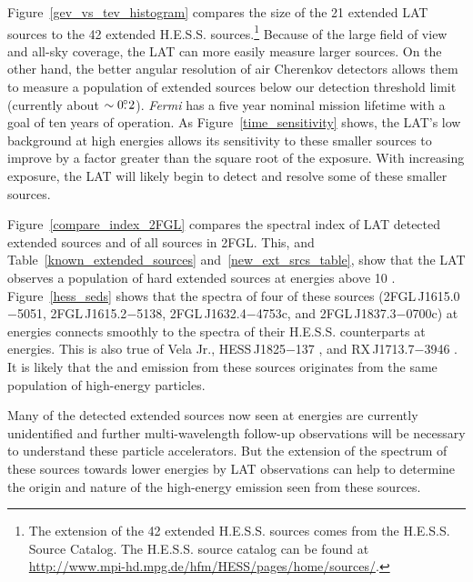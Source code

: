 \documentclass[12pt,preprint]{aastex}
\newcommand{\gev}{\text{GeV}\xspace}
\newcommand{\tev}{\text{TeV}\xspace}
\newcommand{\fermi}{\textit{Fermi}\xspace}
\begin{document}
Figure~\ref{gev_vs_tev_histogram} compares the size of the 21 extended
LAT sources to the 42 extended H.E.S.S. sources.\footnote{The 
\tev extension of
the 42 extended H.E.S.S. sources comes from the H.E.S.S. Source
Catalog. The H.E.S.S. source catalog can be found at \url{http://www.mpi-hd.mpg.de/hfm/HESS/pages/home/sources/}.}
Because of the large
field of view and all-sky coverage, the LAT can more easily measure
larger sources.  On the other hand, the 
better
angular resolution of air Cherenkov detectors allows them to measure a
population of extended sources below our detection threshold limit (currently 
about $\sim0\mbox{$.\!\!^\circ$}2$).  \fermi has a five year nominal mission lifetime with
a goal of ten years of operation.  As Figure~\ref{time_sensitivity} shows,
the LAT's low background at high energies allows its sensitivity 
to
these smaller sources to improve by a factor greater than the square root
of the exposure.  With increasing exposure, the LAT will likely begin to
detect and resolve some of these smaller \tev sources.

Figure~\ref{compare_index_2FGL} compares the spectral index
of LAT detected extended sources and of all sources in 2FGL. This,
and Table~\ref{known_extended_sources} and~\ref{new_ext_srcs_table},
show that the LAT observes a population of hard extended sources at
energies above 10 \gev.  Figure~\ref{hess_seds} shows that the
spectra of four of these sources (2FGL\,J1615.0$-$5051, 2FGL\,J1615.2$-$5138,
2FGL\,J1632.4$-$4753c, and 2FGL\,J1837.3$-$0700c)  
at \gev energies
connects smoothly to the spectra of their H.E.S.S. counterparts at \tev
energies. This is also true of Vela
Jr., HESS\,J1825$-$137 \citep{fermi_hess_j1825}, and RX\,J1713.7$-$3946
\citep{rx_j1713_lat}.  It is likely that the \gev and \tev emission
from these sources originates from the same population of high-energy
particles.

Many of the \tev detected extended sources now seen at \gev energies are
currently unidentified and further multi-wavelength follow-up observations
will be necessary to understand these particle accelerators.  But the
extension of the spectrum of these \tev sources towards lower energies
by LAT observations can help to determine the origin and nature of the
high-energy emission seen from these sources.



\end{document}
